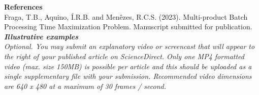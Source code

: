 \documentclass[11pt, letterpaper]{article}
\begin{document}
\noindent
\textbf{References}\\
Fraga, T.B., Aquino, Í.R.B. and Menêzes, R.C.S. (2023). Multi-product Batch Processing Time Maximization
Problem. Manuscript submitted for publication.  \\

\noindent
\textit{\textbf{Illustrative examples}}\\
\textit{Optional. You may submit an explanatory video or screencast that will appear to the right of your published article on ScienceDirect. Only one MP4 formatted video (max. size 150MB) is possible per article and this should be uploaded as a single supplementary file with your submission. Recommended video dimensions are 640 x 480 at a maximum of 30 frames / second. %
}

\vskip 1.5cm
\end{document}
